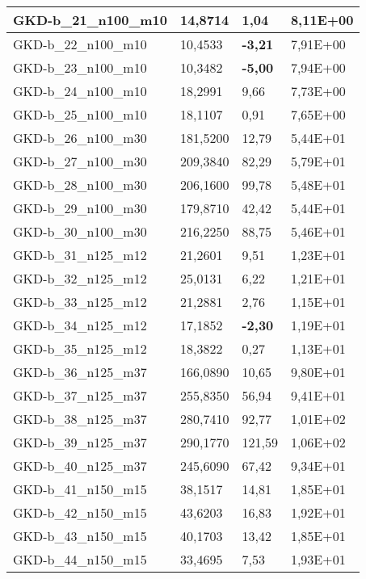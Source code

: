 \begin{table}[!ht]
\begin{adjustbox}{height=12cm}
\begin{tabular}{|l|l|l|l|}
		GKD-b\_21\_n100\_m10 & 14,8714  & 1,04           & 8,11E+00 \\ \hline
		GKD-b\_22\_n100\_m10 & 10,4533  & \textbf{-3,21} & 7,91E+00 \\ \hline
		GKD-b\_23\_n100\_m10 & 10,3482  & \textbf{-5,00} & 7,94E+00 \\ \hline
		GKD-b\_24\_n100\_m10 & 18,2991  & 9,66           & 7,73E+00 \\ \hline
		GKD-b\_25\_n100\_m10 & 18,1107  & 0,91           & 7,65E+00 \\ \hline
		GKD-b\_26\_n100\_m30 & 181,5200 & 12,79          & 5,44E+01 \\ \hline
		GKD-b\_27\_n100\_m30 & 209,3840 & 82,29          & 5,79E+01 \\ \hline
		GKD-b\_28\_n100\_m30 & 206,1600 & 99,78          & 5,48E+01 \\ \hline
		GKD-b\_29\_n100\_m30 & 179,8710 & 42,42          & 5,44E+01 \\ \hline
		GKD-b\_30\_n100\_m30 & 216,2250 & 88,75          & 5,46E+01 \\ \hline
		GKD-b\_31\_n125\_m12 & 21,2601  & 9,51           & 1,23E+01 \\ \hline
		GKD-b\_32\_n125\_m12 & 25,0131  & 6,22           & 1,21E+01 \\ \hline
		GKD-b\_33\_n125\_m12 & 21,2881  & 2,76           & 1,15E+01 \\ \hline
		GKD-b\_34\_n125\_m12 & 17,1852  & \textbf{-2,30} & 1,19E+01 \\ \hline
		GKD-b\_35\_n125\_m12 & 18,3822  & 0,27           & 1,13E+01 \\ \hline
		GKD-b\_36\_n125\_m37 & 166,0890 & 10,65          & 9,80E+01 \\ \hline
		GKD-b\_37\_n125\_m37 & 255,8350 & 56,94          & 9,41E+01 \\ \hline
		GKD-b\_38\_n125\_m37 & 280,7410 & 92,77          & 1,01E+02 \\ \hline
		GKD-b\_39\_n125\_m37 & 290,1770 & 121,59         & 1,06E+02 \\ \hline
		GKD-b\_40\_n125\_m37 & 245,6090 & 67,42          & 9,34E+01 \\ \hline
		GKD-b\_41\_n150\_m15 & 38,1517  & 14,81          & 1,85E+01 \\ \hline
		GKD-b\_42\_n150\_m15 & 43,6203  & 16,83          & 1,92E+01 \\ \hline
		GKD-b\_43\_n150\_m15 & 40,1703  & 13,42          & 1,85E+01 \\ \hline
		GKD-b\_44\_n150\_m15 & 33,4695  & 7,53           & 1,93E+01 \\ \hline

\end{tabular}
\end{adjustbox}
\end{table}
